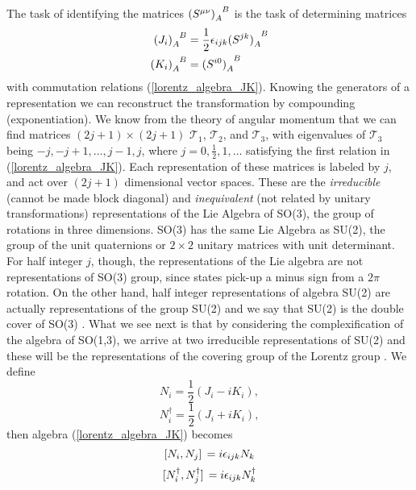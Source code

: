 The task of identifying the matrices $\tend{(S^{\mu\nu})}{A}{B}$ is the task of determining matrices 
\begin{equation}
    \begin{aligned}
        \tend{(J_i)}{A}{B}&=\frac{1}{2}\epsilon_{ijk}\tend{(S^{jk})}{A}{B}\\
        \tend{(K_i)}{A}{B}&=\tend{(S^{i0})}{A}{B}
    \end{aligned}
\end{equation}
with commutation relations (\ref{lorentz_algebra_JK}). Knowing the generators of a representation we can reconstruct the transformation by compounding (exponentiation). We know from the theory of angular momentum that we can find matrices $(2j+1)\times(2j+1)$  $\mathcal{T}_1$, $\mathcal{T}_2$, and $\mathcal{T}_3$, with eigenvalues of $\mathcal{T}_3$ being $-j,-j+1,\dots,j-1,j$, where $j=0,\frac{1}{2},1,\dots$ satisfying the first relation in (\ref{lorentz_algebra_JK}). Each representation of these matrices is labeled by $j$, and act over $(2j+1)$ dimensional vector spaces. These are the \textit{irreducible} (cannot be made block diagonal) and \textit{inequivalent} (not related by unitary transformations) representations of the Lie Algebra of SO(3), the group of rotations in three dimensions. SO(3) has the same Lie Algebra as SU(2), the group of the unit quaternions or $2\times2$ unitary matrices with unit determinant. For half integer $j$, though, the representations of the Lie algebra are not representations of SO(3) group, since states pick-up a minus sign from a $2\pi$ rotation. On the other hand, half integer representations of algebra SU(2) are actually representations of the group SU(2) and we say that SU(2) is the double cover of SO(3) \cite{schwichtenberg2017physics}.
What we see next is that by considering the complexification of the algebra of SO(1,3), we arrive at two irreducible representations of SU(2) and these will be the representations of the covering group of the Lorentz group \cite{schwichtenberg2017physics}. We define
\begin{equation}
    N_i=\frac{1}{2}(J_i-iK_i),
    \label{Ni}
\end{equation}
\begin{equation}
    N_i^\dagger=\frac{1}{2}(J_i+iK_i),
    \label{Nidagger}
\end{equation}
then algebra (\ref{lorentz_algebra_JK})  becomes
\begin{equation}
    \comm*{N_i}{N_j}=i\epsilon_{ijk}N_k
\end{equation}
\begin{equation}
    \comm*{N_i^\dagger}{N_j^\dagger}=i\epsilon_{ijk}N_k^\dagger
\end{equation}
